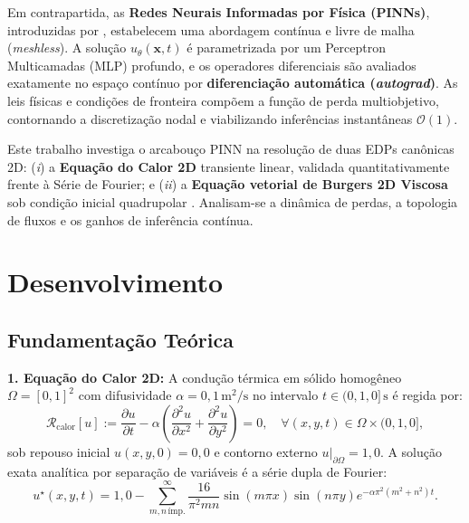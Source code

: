 \documentclass[a4paper, 12pt, twoside]{article}
\begin{document}
Em contrapartida, as \textbf{Redes Neurais Informadas por Física (PINNs)}, introduzidas por \textcite{raissi2019pinns}, estabelecem uma abordagem contínua e livre de malha (\textit{meshless}). A solução $u_\theta(\mathbf{x}, t)$ é parametrizada por um Perceptron Multicamadas (MLP) profundo, e os operadores diferenciais são avaliados exatamente no espaço contínuo por \textbf{diferenciação automática (\textit{autograd})}. As leis físicas e condições de fronteira compõem a função de perda multiobjetivo, contornando a discretização nodal e viabilizando inferências instantâneas $\mathcal{O}(1)$.

Este trabalho investiga o arcabouço PINN na resolução de duas EDPs canônicas 2D: (\textit{i}) a \textbf{Equação do Calor 2D} transiente linear, validada quantitativamente frente à Série de Fourier; e (\textit{ii}) a \textbf{Equação vetorial de Burgers 2D Viscosa} sob condição inicial quadrupolar \parencite{burgers1948model, pereira2019}. Analisam-se a dinâmica de perdas, a topologia de fluxos e os ganhos de inferência contínua.

\section{Desenvolvimento}

\subsection{Fundamentação Teórica}

\textbf{1. Equação do Calor 2D:} A condução térmica em sólido homogêneo $\Omega = [0, 1]^2$ com difusividade $\alpha = 0{,}1\,\text{m}^2/\text{s}$ no intervalo $t \in (0, 1{,}0]\,\text{s}$ é regida por:
\begin{equation}
    \mathcal{R}_{\text{calor}}[u] := \frac{\partial u}{\partial t} - \alpha \left( \frac{\partial^2 u}{\partial x^2} + \frac{\partial^2 u}{\partial y^2} \right) = 0, \quad \forall (x, y, t) \in \Omega \times (0, 1{,}0], \label{eq:heat}
\end{equation}
sob repouso inicial $u(x, y, 0) = 0{,}0$ e contorno externo $u|_{\partial\Omega} = 1{,}0$. A solução exata analítica por separação de variáveis é a série dupla de Fourier:
\begin{equation}
    u^\star(x, y, t) = 1{,}0 - \sum_{m, n\,\text{ímp.}}^\infty \frac{16}{\pi^2 m n} \sin(m \pi x) \sin(n \pi y) e^{-\alpha \pi^2 (m^2 + n^2) t}. \label{eq:fourier}
\end{equation}
\end{document}
